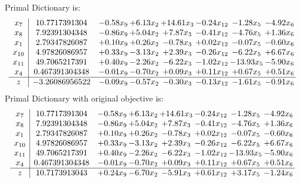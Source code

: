 \documentclass[8pt]{article}
\begin{document}
Primal Dictionary is:
\[\begin{array}{c| c c@{\hskip 2pt} c@{\hskip 2pt} c@{\hskip 2pt} c@{\hskip 2pt} c@{\hskip 2pt} c@{\hskip 2pt} }
 x_{7}   &  10.7717391304 & -0.58 x_{9} & +  6.13 x_{2} & + 14.61 x_{3} & -0.24 x_{12} & -1.28 x_{5} & -4.92 x_{6}\\
 x_{8}   &  7.92391304348 & -0.86 x_{9} & +  5.04 x_{2} & +  7.87 x_{3} & -0.41 x_{12} & -4.76 x_{5} & +  1.36 x_{6}\\
 x_{1}   &  2.79347826087 & +  0.10 x_{9} & +  0.26 x_{2} & -0.78 x_{3} & +  0.02 x_{12} & -0.07 x_{5} & -0.60 x_{6}\\
 x_{10}   &  4.97826086957 & +  0.33 x_{9} & -3.13 x_{2} & +  2.39 x_{3} & -0.26 x_{12} & -6.22 x_{5} & +  6.67 x_{6}\\
 x_{11}   &  49.7065217391 & +  0.40 x_{9} & -2.26 x_{2} & -6.22 x_{3} & -1.02 x_{12} & -13.93 x_{5} & -5.90 x_{6}\\
 x_{4}   &  0.467391304348 & -0.01 x_{9} & -0.70 x_{2} & +  0.09 x_{3} & +  0.11 x_{12} & +  0.67 x_{5} & +  0.51 x_{6}\\
\hline
z    &  -3.26086956522 & -0.09 x_{9} & -0.57 x_{2} & -0.30 x_{3} & -0.13 x_{12} & -1.61 x_{5} & -0.91 x_{6}\\
\end{array}\]
Primal Dictionary with original objective is:
\[\begin{array}{c| c c@{\hskip 2pt} c@{\hskip 2pt} c@{\hskip 2pt} c@{\hskip 2pt} c@{\hskip 2pt} c@{\hskip 2pt} }
 x_{7}   &  10.7717391304 & -0.58 x_{9} & +  6.13 x_{2} & + 14.61 x_{3} & -0.24 x_{12} & -1.28 x_{5} & -4.92 x_{6}\\
 x_{8}   &  7.92391304348 & -0.86 x_{9} & +  5.04 x_{2} & +  7.87 x_{3} & -0.41 x_{12} & -4.76 x_{5} & +  1.36 x_{6}\\
 x_{1}   &  2.79347826087 & +  0.10 x_{9} & +  0.26 x_{2} & -0.78 x_{3} & +  0.02 x_{12} & -0.07 x_{5} & -0.60 x_{6}\\
 x_{10}   &  4.97826086957 & +  0.33 x_{9} & -3.13 x_{2} & +  2.39 x_{3} & -0.26 x_{12} & -6.22 x_{5} & +  6.67 x_{6}\\
 x_{11}   &  49.7065217391 & +  0.40 x_{9} & -2.26 x_{2} & -6.22 x_{3} & -1.02 x_{12} & -13.93 x_{5} & -5.90 x_{6}\\
 x_{4}   &  0.467391304348 & -0.01 x_{9} & -0.70 x_{2} & +  0.09 x_{3} & +  0.11 x_{12} & +  0.67 x_{5} & +  0.51 x_{6}\\
\hline
z    &  10.7173913043 & +  0.24 x_{9} & -6.70 x_{2} & -5.91 x_{3} & +  0.61 x_{12} & +  3.17 x_{5} & -1.24 x_{6}\\
\end{array}\]
\end{document}
